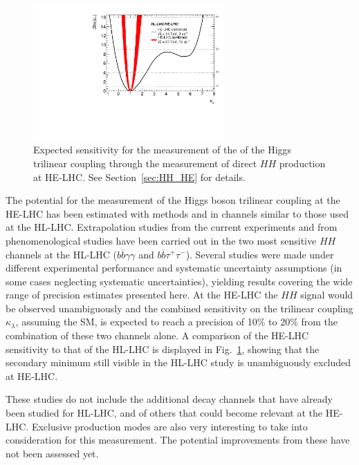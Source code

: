 \documentclass[../report.tex]{subfiles}
\begin{document}
\begin{figure}
\begin{center}
\includegraphics[width=0.65\textwidth]{section10/img/HH_HE-LHC.pdf}
\caption{Expected sensitivity for the measurement of the of the Higgs trilinear coupling through the measurement of direct $HH$ production at HE-LHC. See Section~\ref{sec:HH_HE} for details.}
\label{fig:HiggsHH_HE}
\end{center}
\end{figure}

The potential for the measurement of the Higgs boson trilinear coupling at the HE-LHC has been estimated with methods and in channels similar to those used at the HL-LHC. Extrapolation studies from the current experiments and from phenomenological studies have been carried out in the two most sensitive $HH$ channels at the HL-LHC ($b\overline{b}\gamma\gamma$ and $b\overline{b}\tau^+\tau^-$). 
Several studies were made under different experimental performance and systematic uncertainty assumptions (in some cases neglecting systematic uncertainties), yielding results covering the wide range of precision estimates presented here. At the HE-LHC the $HH$ signal would be observed unambiguously and the combined sensitivity on the trilinear coupling $\kappa_{\lambda}$, assuming the SM, is expected to reach a precision of 10\% to 20\% from the combination of these two channels alone. A comparison of the HE-LHC sensitivity to that of the HL-LHC is displayed in Fig.~\ref{fig:HiggsHH_HE}, showing that the secondary minimum still visible in the HL-LHC study is unambiguously excluded at HE-LHC. 

These studies do not include the additional decay channels that have already been studied for HL-LHC, and of others that could become relevant at the HE-LHC. Exclusive production modes are also very interesting to take into consideration for this measurement. The potential improvements from these have not been assessed yet.
\end{document}
